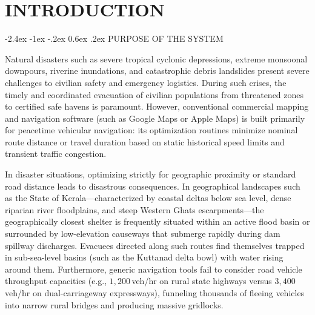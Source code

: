 \documentclass[12pt,oneside]{report}
\makeatletter
\renewcommand{\section}{\@startsection{section}{1}{\z@}%
  {-2.4ex \@plus -1ex \@minus -.2ex}%
  {0.6ex \@plus .2ex}%
  {\normalfont\large\bfseries}}
\newcommand{\chapterpage}[1]{\chapter{#1}}
\makeatother
\begin{document}
\setcounter{page}{1}

\chapterpage{INTRODUCTION}
\section{PURPOSE OF THE SYSTEM}

Natural disasters such as severe tropical cyclonic depressions, extreme monsoonal downpours, riverine inundations, and catastrophic debris landslides present severe challenges to civilian safety and emergency logistics. During such crises, the timely and coordinated evacuation of civilian populations from threatened zones to certified safe havens is paramount. However, conventional commercial mapping and navigation software (such as Google Maps or Apple Maps) is built primarily for peacetime vehicular navigation: its optimization routines minimize nominal route distance or travel duration based on static historical speed limits and transient traffic congestion.

In disaster situations, optimizing strictly for geographic proximity or standard road distance leads to disastrous consequences. In geographical landscapes such as the State of Kerala---characterized by coastal deltas below sea level, dense riparian river floodplains, and steep Western Ghats escarpments---the geographically closest shelter is frequently situated within an active flood basin or surrounded by low-elevation causeways that submerge rapidly during dam spillway discharges. Evacuees directed along such routes find themselves trapped in sub-sea-level basins (such as the Kuttanad delta bowl) with water rising around them. Furthermore, generic navigation tools fail to consider road vehicle throughput capacities (e.g., $1,200$\,veh/hr on rural state highways versus $3,400$\,veh/hr on dual-carriageway expressways), funneling thousands of fleeing vehicles into narrow rural bridges and producing massive gridlocks.
\end{document}
